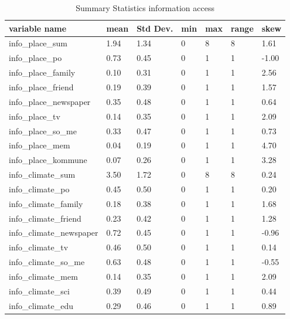 \begin{center}
\begin{table}[h]
    \centering
    \begin{tabular}{|l|l|l|l|l|l|l|}
    \hline
        variable name & mean & Std Dev. & min & max & range & skew  \\ \hline
        info\_place\_sum & 1.94 & 1.34 & 0 & 8 & 8 & 1.61 \\ \hline
        info\_place\_po & 0.73 & 0.45 & 0 & 1 & 1 & -1.00  \\ \hline
        info\_place\_family & 0.10 & 0.31 & 0 & 1 & 1 & 2.56 \\ \hline
        info\_place\_friend & 0.19 & 0.39 & 0 & 1 & 1 & 1.57  \\ \hline
        info\_place\_newspaper & 0.35 & 0.48 & 0 & 1 & 1 & 0.64  \\ \hline
        info\_place\_tv & 0.14 & 0.35 & 0 & 1 & 1 & 2.09 \\ \hline
        info\_place\_so\_me & 0.33 & 0.47 & 0 & 1 & 1 & 0.73  \\ \hline
        info\_place\_mem & 0.04 & 0.19 & 0 & 1 & 1 & 4.70 \\ \hline
        info\_place\_kommune & 0.07 & 0.26 & 0 & 1 & 1 & 3.28\\ \hline
        info\_climate\_sum & 3.50 & 1.72 & 0 & 8 & 8 & 0.24  \\ \hline
        info\_climate\_po & 0.45 & 0.50 & 0 & 1 & 1 & 0.20 \\ \hline
        info\_climate\_family & 0.18 & 0.38 & 0 & 1 & 1 & 1.68  \\ \hline
        info\_climate\_friend & 0.23 & 0.42 & 0 & 1 & 1 & 1.28  \\ \hline
        info\_climate\_newspaper & 0.72 & 0.45 & 0 & 1 & 1 & -0.96 \\ \hline
        info\_climate\_tv & 0.46 & 0.50 & 0 & 1 & 1 & 0.14 \\ \hline
        info\_climate\_so\_me & 0.63 & 0.48 & 0 & 1 & 1 & -0.55 \\ \hline
        info\_climate\_mem & 0.14 & 0.35 & 0 & 1 & 1 & 2.09 \\ \hline
        info\_climate\_sci & 0.39 & 0.49 & 0 & 1 & 1 & 0.44 \\ \hline
        info\_climate\_edu & 0.29 & 0.46 & 0 & 1 & 1 & 0.89 \\ \hline
        
         \end{tabular}
    \caption{Summary Statistics information access}
\label{table:summary_stats_info_access}
\end{table}
\end{center}


